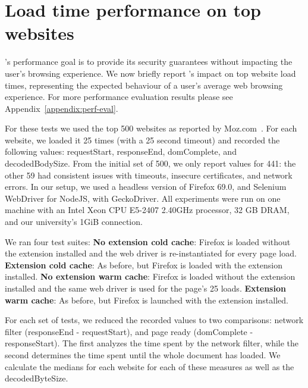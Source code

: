 \section{Load time performance on top websites} \label{performance}

\sys's performance goal is to provide its security guarantees without
impacting the user's browsing experience. We now briefly report \sys's
impact on top website load times, representing the expected behaviour
of a user's average web browsing experience. For more performance
evaluation results please see Appendix~\ref{appendix:perf-eval}.

% 
For these tests we used the top 500 websites as
reported by Moz.com~\cite{top500}. For each website, we loaded it 25
times (with a 25 second timeout) and recorded the following values:
requestStart, responseEnd, domComplete, and decodedBodySize. From the
initial set of 500, we only report values for 441: the other 59 had
consistent issues with timeouts, insecure certificates, and network
errors. In our setup, we used a headless version of Firefox 69.0, and
Selenium WebDriver for NodeJS, with GeckoDriver. All experiments were
run on one machine with an Intel Xeon CPU E5-2407 2.40GHz processor,
32 GB DRAM, and our university's 1GiB connection.

We ran four test suites:
\textbf{No extension cold cache}: Firefox is loaded without the extension installed and the web driver is re-instantiated for every page load.
\textbf{Extension cold cache}: As before, but Firefox is loaded with the extension installed.
\textbf{No extension warm cache}: Firefox is loaded without the extension installed and the same web driver is used for the page's 25 loads.
\textbf{Extension warm cache}: As before, but Firefox is launched with the extension installed.

For each set of tests, we reduced the recorded values to two comparisons: network filter (responseEnd - requestStart), and page ready (domComplete - responseStart). The first analyzes the time spent by the network filter, while the second determines the time spent until the whole document has loaded. We calculate the medians for each website for each of these measures as well as the decodedByteSize.


